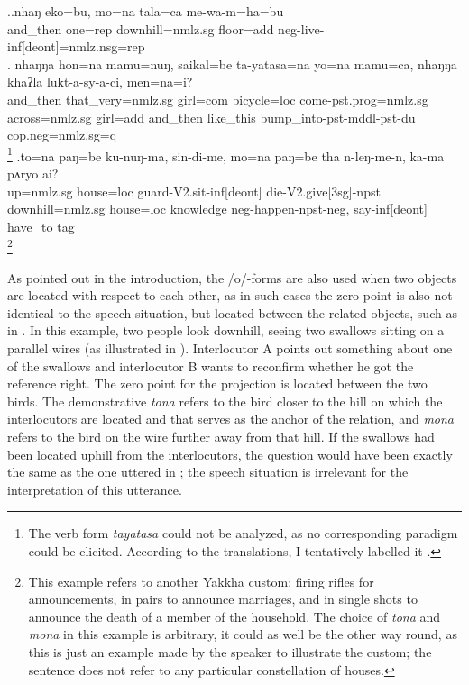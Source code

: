 \ex.\ag.\label{mewamhabu}nhaŋ eko=bu,    mo=na tala=ca         me-wa-m=ha=bu\\
and\_then one{\sc =rep} downhill{\sc =nmlz.sg} floor{\sc =add} {\sc neg-}live{\sc -inf[deont]=nmlz.nsg=rep} \\
 
\bg. nhaŋŋa hon=na mamu=nuŋ, saikal=be ta-yatasa=na yo=na mamu=ca, nhaŋŋa khaʔla lukt-a-sy-a-ci,  men=na=i?	\\
	and\_then that\_very{\sc =nmlz.sg} girl{\sc =com} bicycle{\sc =loc} come{\sc [3sg]-pst.prog=nmlz.sg} across{\sc =nmlz.sg} girl{\sc =add} and\_then like\_this bump\_into{\sc -pst-mddl-pst-du} {\sc cop.neg=nmlz.sg=q}\\
\footnote{The verb form \emph{tayatasa} could not be analyzed, as no corresponding paradigm could be elicited. According to the  translations, I tentatively labelled it .} 
\bg.to=na  paŋ=be     ku-nuŋ-ma, sin-di-me,  mo=na  paŋ=be     tha  n-leŋ-me-n, ka-ma pʌryo  ai?\\
up{\sc =nmlz.sg} house{\sc =loc} guard{\sc -V2.sit-inf[deont]} die{\sc -V2.give[3sg]-npst} downhill{\sc =nmlz.sg} house{\sc =loc} knowledge {\sc neg-}happen{\sc [3sg]-npst-neg}, say{\sc -inf[deont]} have\_to {\sc tag}\\
\footnote{This example refers to another Yakkha custom: firing rifles for announcements, in pairs to announce marriages, and in single shots to announce the death of a  member of the household. The choice of \emph{tona} and \emph{mona} in this example is arbitrary, it could as well be the other way round, as this is just an example made by the speaker to illustrate the custom; the sentence does not refer to any particular constellation of houses.} 	 
   			
			
As pointed out in the introduction, the /o/-forms are also used when two objects are located with respect to each other, as in such cases the zero point is also not identical to the speech situation, but located between the related objects, such as in \Next. In this example, two people look downhill, seeing two swallows  sitting on a parallel wires (as illustrated in ). Interlocutor A points out something about one of the  swallows and interlocutor B wants to reconfirm whether he got the reference right. The  zero point for the projection is located between the two birds. The demonstrative \emph{tona} refers to the bird closer to the hill on which the interlocutors are located and that serves as the anchor of the relation, and \emph{mona} refers to the bird on the wire  further away from that hill. If the swallows had been located uphill from the interlocutors, the question would have been exactly the same as the one uttered in \Next; the speech situation is irrelevant for the interpretation of this utterance.

